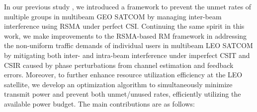 \documentclass[draftclsnofoot, onecolumn, comsoc, 12pt]{IEEEtran}
\begin{document}
{In our previous study \cite{10304489}, we introduced a framework to prevent the unmet rates of multiple groups in multibeam GEO SATCOM by managing inter-beam interference using RSMA under perfect CSI. Continuing the same spirit in this work, we make improvements to the RSMA-based RM framework in addressing the non-uniform traffic demands of individual users in multibeam LEO SATCOM by mitigating both inter- and intra-beam interference under imperfect CSIT and CSIR caused by phase perturbations from channel estimation and feedback errors. Moreover, to further enhance resource utilization efficiency at the LEO satellite, we develop an optimization algorithm to simultaneously minimize transmit power and prevent both unmet/unused rates, efficiently utilizing the available power budget.
The main contributions are as follows:}
\end{document}
